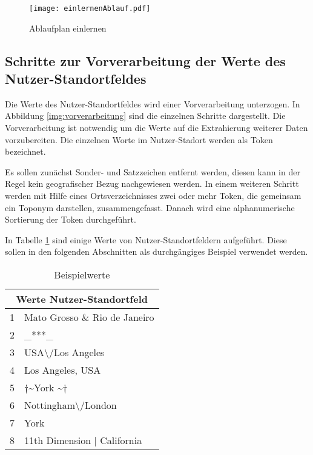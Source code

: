 			\begin{figure}[!htb]
				\begin{center}
					\texttt{[image: einlernenAblauf.pdf]}
					\caption{Ablaufplan einlernen}
					\label{img:einlernenAblauf}
				\end{center}
			\end{figure}
			\clearpage

		\subsection{Schritte zur Vorverarbeitung der Werte des Nutzer-Standortfeldes} \label{sub:Vorv}

			Die Werte des Nutzer-Standortfeldes wird einer Vorverarbeitung unterzogen.
			In Abbildung \ref{img:vorverarbeitung} sind die einzelnen Schritte dargestellt.
			Die Vorverarbeitung ist notwendig um die Werte auf die Extrahierung weiterer Daten vorzubereiten.
			Die einzelnen Worte im Nutzer-Stadort werden als Token bezeichnet. 
			
			Es sollen zunächst Sonder- und Satzzeichen entfernt werden, diesen kann in der Regel kein geografischer Bezug nachgewiesen werden.
			In einem weiteren Schritt werden mit Hilfe eines Ortsverzeichnisses zwei oder mehr Token, die gemeinsam ein Toponym darstellen, zusammengefasst.
			Danach wird eine alphanumerische Sortierung der Token durchgeführt.

			In Tabelle \ref{tab:VorverarbeitungBsp1} sind einige Werte von Nutzer-Standortfeldern aufgeführt.
			Diese sollen in den folgenden Abschnitten als durchgängiges Beispiel verwendet werden.

				\begin{table}[h]
					\centering
					\caption{Beispielwerte}
					\label{tab:VorverarbeitungBsp1}
					\begin{tabular}{|l|l|}
					\hline 
					\multicolumn{2}{|c|}{\textbf{Werte Nutzer-Standortfeld}} \\ \hline \hline
					1&Mato Grosso \& Rio de Janeiro                      			\\ \hline
					2&\_***\_                                         			\\ \hline
					3&USA\textbackslash /Los Angeles                  			\\ \hline
					4&Los Angeles, USA                                			\\ \hline
					5&$\dagger$\textasciitilde York \textasciitilde$\dagger$      \\ \hline
					6&Nottingham\textbackslash /London                			\\ \hline
					7&York                                            			\\ \hline
					8&11th Dimension | California 					\\ \hline	
					\end{tabular}
				\end{table} 
			 

